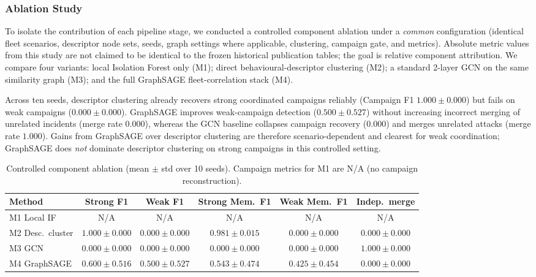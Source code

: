 \subsubsection{\textbf{Ablation Study}}
\label{sec:ablation-reviewer}

To isolate the contribution of each pipeline stage, we conducted a controlled
component ablation under a \emph{common} configuration (identical fleet scenarios,
descriptor node sets, seeds, graph settings where applicable, clustering, campaign
gate, and metrics). Absolute metric values from this study are not claimed to be
identical to the frozen historical publication tables; the goal is relative
component attribution. We compare four variants: local Isolation Forest only (M1);
direct behavioural-descriptor clustering (M2); a standard 2-layer GCN on the same
similarity graph (M3); and the full GraphSAGE fleet-correlation stack (M4).

Across ten seeds, descriptor clustering already recovers strong coordinated campaigns
reliably (Campaign F1 $1.000\pm0.000$) but fails on weak campaigns
($0.000\pm0.000$). GraphSAGE improves weak-campaign detection
($0.500\pm0.527$) without increasing incorrect merging of unrelated incidents
(merge rate $0.000$), whereas the GCN baseline collapses campaign recovery
($0.000$) and merges unrelated attacks (merge rate $1.000$). Gains from GraphSAGE
over descriptor clustering are therefore scenario-dependent and clearest for weak
coordination; GraphSAGE does \emph{not} dominate descriptor clustering on strong
campaigns in this controlled setting.

\begin{table}[t]
\centering
\caption{Controlled component ablation (mean $\pm$ std over 10 seeds).
Campaign metrics for M1 are N/A (no campaign reconstruction).}
\label{tab:reviewer-ablation}
\scriptsize
\begin{tabular}{lccccc}
\toprule
Method & Strong F1 & Weak F1 & Strong Mem.\ F1 & Weak Mem.\ F1 & Indep.\ merge \\
\midrule
M1 Local IF & N/A & N/A & N/A & N/A & N/A \\
M2 Desc.\ cluster & $1.000\pm0.000$ & $0.000\pm0.000$ & $0.981\pm0.015$ & $0.000\pm0.000$ & $0.000\pm0.000$ \\
M3 GCN & $0.000\pm0.000$ & $0.000\pm0.000$ & $0.000\pm0.000$ & $0.000\pm0.000$ & $1.000\pm0.000$ \\
M4 GraphSAGE & $0.600\pm0.516$ & $0.500\pm0.527$ & $0.543\pm0.474$ & $0.425\pm0.454$ & $0.000\pm0.000$ \\
\bottomrule
\end{tabular}
\end{table}
